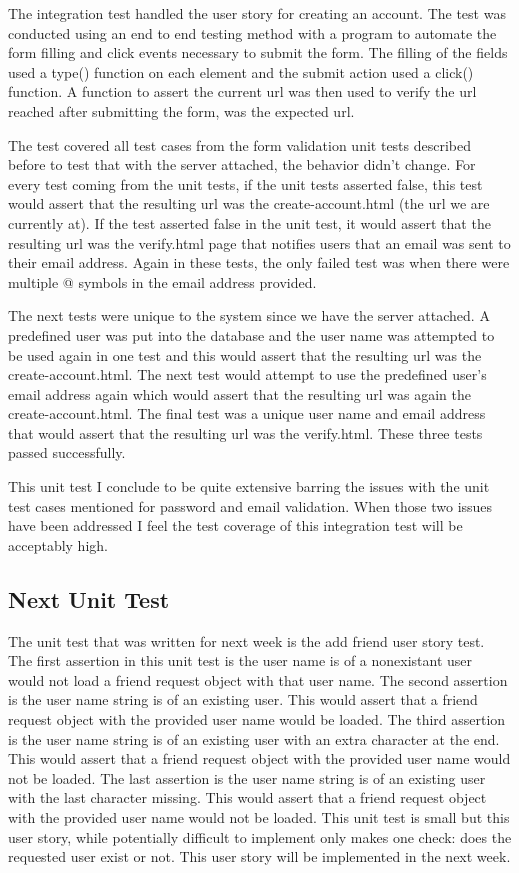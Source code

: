 \documentclass[a4paper]{article}
\begin{document}
The integration test handled the user story for creating an account.
The test was conducted using an end to end testing method with a program to automate the form filling and click events necessary to submit the form.
The filling of the fields used a type() function on each element and the submit action used a click() function.
A function to assert the current url was then used to verify the url reached after submitting the form, was the expected url.


The test covered all test cases from the form validation unit tests described before to test that with the server attached, the behavior didn't change.
For every test coming from the unit tests, if the unit tests asserted false, this test would assert that the resulting url was the create-account.html (the url we are currently at).
If the test asserted false in the unit test, it would assert that the resulting url was the verify.html page that notifies users that an email was sent to their email address.
Again in these tests, the only failed test was when there were multiple @ symbols in the email address provided.

The next tests were unique to the system since we have the server attached.
A predefined user was put into the database and the user name was attempted to be used again in one test and this would assert that the resulting url was the create-account.html.
The next test would attempt to use the predefined user's email address again which would assert that the resulting url was again the create-account.html.
The final test was a unique user name and email address that would assert that the resulting url was the verify.html.
These three tests passed successfully.

This unit test I conclude to be quite extensive barring the issues with the unit test cases mentioned for password and email validation.
When those two issues have been addressed I feel the test coverage of this integration test will be acceptably high.

\subsection{Next Unit Test}

The unit test that was written for next week is the add friend user story test.
The first assertion in this unit test is the user name is of a nonexistant user would not load a friend request object with that user name.
The second assertion is the user name string is of an existing user.
This would assert that a friend request object with the provided user name would be loaded.
The third assertion is the user name string is of an existing user with an extra character at the end.
This would assert that a friend request object with the provided user name would not be loaded.
The last assertion is the user name string is of an existing user with the last character missing.
This would assert that a friend request object with the provided user name would not be loaded.
This unit test is small but this user story, while potentially difficult to implement only makes one check: does the requested user exist or not.
This user story will be implemented in the next week.
\end{document}
